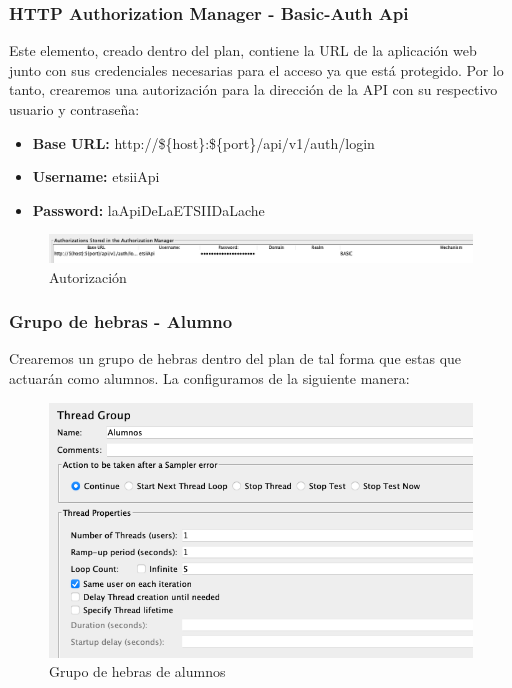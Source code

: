 \subsubsection{HTTP Authorization Manager - Basic-Auth Api}
Este elemento, creado dentro del plan, contiene la URL de la aplicación web junto con sus credenciales necesarias para el acceso ya que está protegido. Por lo tanto,
crearemos una autorización para la dirección de la API con su respectivo usuario y contraseña:
\begin{itemize}
    \item \textbf{Base URL:} http://\$\{host\}:\$\{port\}/api/v1/auth/login
    \item \textbf{Username:} etsiiApi
    \item \textbf{Password:} laApiDeLaETSIIDaLache
\end{itemize}

\begin{figure}[H]
    \centering
    \includegraphics[scale=0.4]{images/autorizacion.png}
    \caption{Autorización}
    \label{fig:autorizacion}
\end{figure}

\subsubsection{Grupo de hebras - Alumno}
Crearemos un grupo de hebras dentro del plan de tal forma que estas que actuarán como alumnos. La configuramos de la siguiente manera:
\begin{figure}[H]
    \centering
    \includegraphics[scale=0.35]{images/hebras_alumnos.png}
    \caption{Grupo de hebras de alumnos}
    \label{fig:hebras_alumnos}
\end{figure}


